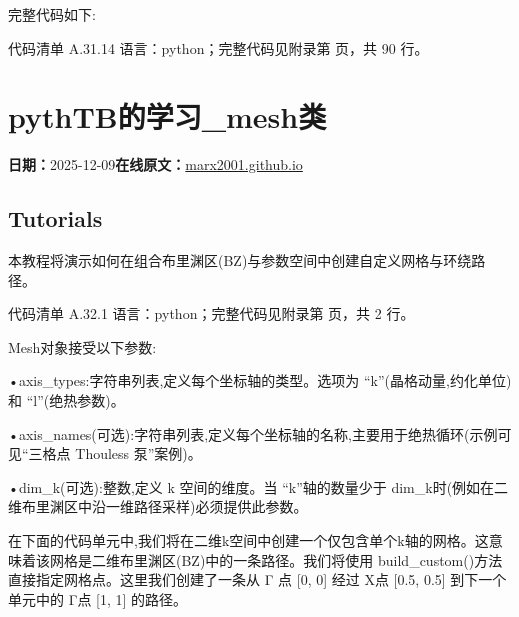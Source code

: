 \documentclass[lang=cn,scheme=chinese,color=blue,device=normal,toc=onecol,math=cm]{elegantbook}
\begin{document}
完整代码如下:\par


\begin{codeindexbox}{代码清单 A.31.14}
语言：python；完整代码见附录第 \pageref{code:31:14} 页，共 90 行。
\end{codeindexbox}



\section{pythTB的学习\_\allowbreak{}mesh类}
\begin{articlemeta}
\textbf{日期：}2025-12-09\hfill\textbf{在线原文：}\href{https://marx2001.github.io/sci-note\_posts/20251209-PythonTB\_mesh}{marx2001.github.io}
\end{articlemeta}

\subsection{Tutorials}


本教程将演示如何在组合布里渊区(BZ)与参数空间中创建自定义网格与环绕路径。\par


\begin{codeindexbox}{代码清单 A.32.1}
语言：python；完整代码见附录第 \pageref{code:32:1} 页，共 2 行。
\end{codeindexbox}


Mesh对象接受以下参数:\par


•axis\_\allowbreak{}types:字符串列表,定义每个坐标轴的类型。选项为 “k”(晶格动量,约化单位)和 “l”(绝热参数)。\par


•axis\_\allowbreak{}names(可选):字符串列表,定义每个坐标轴的名称,主要用于绝热循环(示例可见“三格点 Thouless 泵”案例)。\par


•dim\_\allowbreak{}k(可选):整数,定义 k 空间的维度。当 “k”轴的数量少于 dim\_\allowbreak{}k时(例如在二维布里渊区中沿一维路径采样)必须提供此参数。\par


在下面的代码单元中,我们将在二维k空间中创建一个仅包含单个k轴的网格。这意味着该网格是二维布里渊区(BZ)中的一条路径。我们将使用 build\_\allowbreak{}custom()方法直接指定网格点。这里我们创建了一条从 Γ 点 [0, 0] 经过 X点 [0.5, 0.5] 到下一个单元中的 Γ点 [1, 1] 的路径。\par
\end{document}

